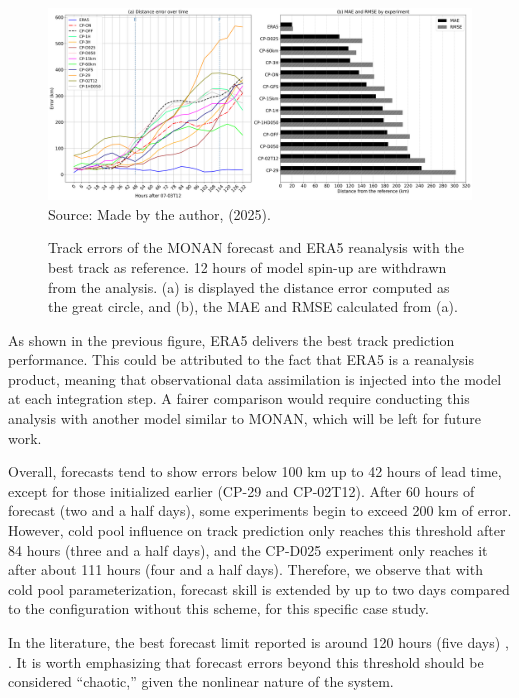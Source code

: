 \begin{figure}[!ht]
	\centering
	\caption{Track errors of the MONAN forecast and ERA5 reanalysis with the best track as reference. 12 hours of model spin-up are withdrawn from the analysis. (a) is displayed the distance error computed as the great circle, and (b), the MAE and RMSE calculated from (a).} %
	\includegraphics[width=\textwidth]{docs/figuras/chapter5/panel_errors_mae_rmse_FINAL.png} 
	\vspace{0.5em}
	Source: Made by the author, (2025).  %
	\label{fig:trackerrors} %
\end{figure}

As shown in the previous figure, ERA5 delivers the best track prediction performance. This could be attributed to the fact that ERA5 is a reanalysis product, meaning that observational data assimilation is injected into the model at each integration step. A fairer comparison would require conducting this analysis with another model similar to MONAN, which will be left for future work.

Overall, forecasts tend to show errors below 100 km up to 42 hours of lead time, except for those initialized earlier (CP-29 and CP-02T12). After 60 hours of forecast (two and a half days), some experiments begin to exceed 200 km of error. However, cold pool influence on track prediction only reaches this threshold after 84 hours (three and a half days), and the CP-D025 experiment only reaches it after about 111 hours (four and a half days). Therefore, we observe that with cold pool parameterization, forecast skill is extended by up to two days compared to the configuration without this scheme, for this specific case study.

In the literature, the best forecast limit reported is around 120 hours (five days) \cite{zhou2020prospects}, \cite{sippel2022impacts}. It is worth emphasizing that forecast errors beyond this threshold should be considered “chaotic,” given the nonlinear nature of the system.

